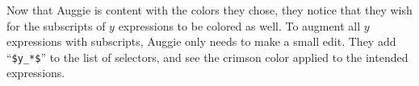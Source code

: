 

Now that Auggie is content with the colors they chose, they notice that they wish for the subscripts of $y$ expressions to be colored as well. To augment all $y$ expressions with subscripts, Auggie only needs to make a small edit.
They add ``\texttt{\$y\_*\$}'' to the list of selectors, and see the crimson color applied to the intended expressions. \\ 

